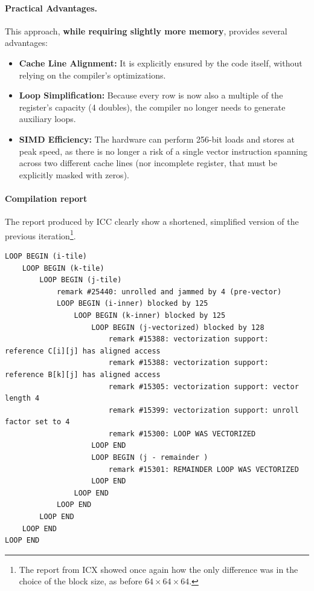 \paragraph{Practical Advantages.}

This approach, \textbf{while requiring slightly more memory}, provides several advantages:

\begin{itemize}
\item \textbf{Cache Line Alignment:} 
It is explicitly ensured by the code itself, without relying on the compiler's optimizations.

\item \textbf{Loop Simplification:} Because every row is now also a multiple of the register's capacity (4 doubles), the compiler no longer needs to generate auxiliary loops.

\item \textbf{SIMD Efficiency:} The hardware can perform 256-bit loads and stores at peak speed, as there is no longer a risk of a single vector instruction spanning across two different cache lines (nor incomplete register, that must be explicitly masked with zeros).
\end{itemize}


\paragraph{Compilation report}
The report produced by ICC clearly show a shortened, simplified version of the previous iteration\footnote{The  report from ICX showed once again how the only difference was in the choice of the block size, as before $64 \times 64 \times 64$.}.


\begin{lstlisting}[style=CStyle, caption={Optimization report of ICC with \texttt{-O3 -xHost -DALIGN}.}]
LOOP BEGIN (i-tile)
    LOOP BEGIN (k-tile)
        LOOP BEGIN (j-tile)
            remark #25440: unrolled and jammed by 4 (pre-vector)    
            LOOP BEGIN (i-inner) blocked by 125
                LOOP BEGIN (k-inner) blocked by 125
                    LOOP BEGIN (j-vectorized) blocked by 128
                        remark #15388: vectorization support: reference C[i][j] has aligned access
                        remark #15388: vectorization support: reference B[k][j] has aligned access
                        remark #15305: vectorization support: vector length 4
                        remark #15399: vectorization support: unroll factor set to 4
                        remark #15300: LOOP WAS VECTORIZED
                    LOOP END
                    LOOP BEGIN (j - remainder )
                        remark #15301: REMAINDER LOOP WAS VECTORIZED
                    LOOP END
                LOOP END
            LOOP END
        LOOP END
    LOOP END
LOOP END
\end{lstlisting}

